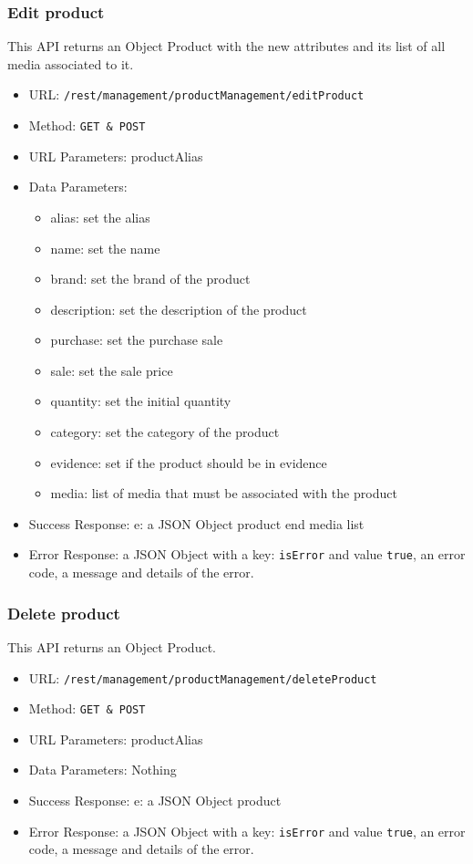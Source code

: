 \subsubsection*{Edit product}
This API returns an Object Product with the new attributes and its list of all media associated to it.

\begin{itemize}
    \item URL: \texttt{/rest/management/productManagement/editProduct}
    \item Method: \texttt{{GET \& POST}}
    \item URL Parameters: productAlias
    \item Data Parameters: 
    \begin{itemize}
        \item alias: set the alias
        \item name: set the name
        \item brand: set the brand of the product
        \item description: set the description of the product
        \item purchase: set the purchase sale
        \item sale: set the sale price
        \item quantity: set the initial quantity
        \item category: set the category of the product
        \item evidence: set if the product should be in evidence
        \item media: list of media that must be associated with the product
    \end{itemize}
    \item Success Response: e: a JSON Object product end media list
    \item Error Response: a JSON Object with a key: \texttt{isError}  and value \texttt{true}, an error code, a message and details of the error.
\end{itemize}



\subsubsection*{Delete product}
This API returns an Object Product.

\begin{itemize}
    \item URL: \texttt{/rest/management/productManagement/deleteProduct}
    \item Method: \texttt{{GET \& POST}}
    \item URL Parameters: productAlias
    \item Data Parameters: Nothing
    \item Success Response: e: a JSON Object product
    \item Error Response: a JSON Object with a key: \texttt{isError}  and value \texttt{true}, an error code, a message and details of the error.
\end{itemize}


